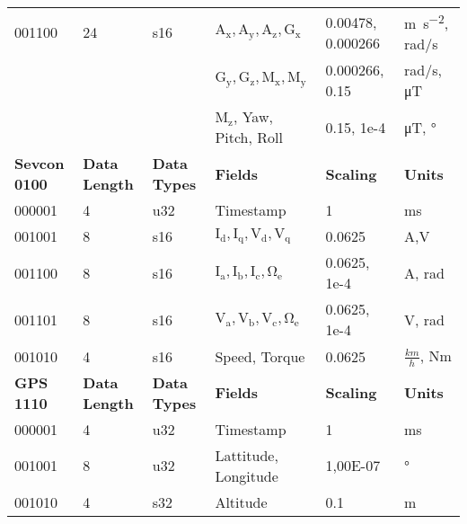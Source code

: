 \begin{table}[H]
{{\begin{tabular}{@{\makebox[3em][r]{\rownumber\space}}|llllll}
		    001100               & 24                   & s16                 & $\mathrm{A_x, A_y, A_z, G_x}$            & 0.00478,  0.000266 & \si{\meter \per \second \squared}, rad/s        \\
		    &                      &                     & $\mathrm{G_y, G_z, M_x, M_y}$              & 0.000266, 0.15     & rad/s, \si{\micro \tesla}                       \\
		    &                      &                     & $\mathrm{M_z}$, Yaw, Pitch, Roll        & 0.15, 1e-4         & \si{\micro \tesla}, \si{\degree}                    \\
		    \hline
		    \textbf{Sevcon 0100} & \textbf{Data Length } & \textbf{Data Types} & \textbf{Fields}             & \textbf{Scaling}   & \textbf{Units}                                    \\
		    \hline
		    000001               & 4                    & u32                 & Timestamp                   & 1                  & ms                                                \\
		    001001               & 8                    & s16                 & $\mathrm{I_d,I_q,V_d,V_q}$                & 0.0625             & A,V                                               \\
		    001100               & 8                    & s16                 & $\mathrm{I_a, I_b, I_c, \Omega_e}$ & 0.0625, 1e-4       & A, rad                                            \\
		    001101               & 8                    & s16                 & $\mathrm{V_a, V_b, V_c, \Omega_e}$ & 0.0625, 1e-4       & V, rad                                            \\
		    001010               & 4                    & s16                 & Speed, Torque               & 0.0625             & $\frac{km}{h}$, Nm                              \\
		    \hline
		    \textbf{GPS 1110}    & \textbf{Data Length } & \textbf{Data Types} & \textbf{Fields}             & \textbf{Scaling}   & \textbf{Units}                                    \\
		    \hline
		    000001               & 4                    & u32                 & Timestamp                   & 1                  & ms                                                \\
		    001001               & 8                    & u32                 & Lattitude, Longitude        & 1,00E-07           & \si{\degree} \\
		    001010               & 4                    & s32                 & Altitude                    & 0.1                & m                                                


\end{tabular}}}
\end{table}
